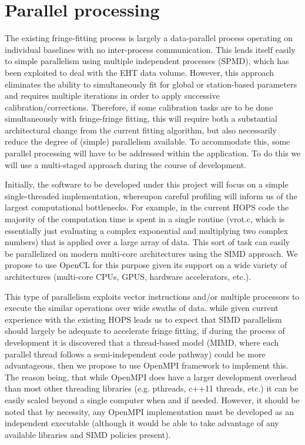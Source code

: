 \documentclass[hidelinks]{article}
\let\Oldsection\section
\renewcommand{\section}{\FloatBarrier\Oldsection}
\begin{document}


\section{Parallel processing}

The existing fringe-fitting process is largely a data-parallel process operating on individual baselines with no inter-process
communication. This lends itself easily to simple parallelism using multiple independent processes (SPMD), which has been exploited
\cite{blackburn2019eht} to deal with the EHT data volume. However, this approach eliminates the ability to simultaneously fit for global or station-based
parameters and requires multiple iterations in order to apply successive calibration/corrections. Therefore, if some calibration tasks are to be
done simultaneously with fringe-fringe fitting, this will require both a substantial architectural change from the current fitting algorithm, but
also necessarily reduce the degree of (simple) parallelism available. To accommodate this, some parallel processing will have to be addressed
within the application. To do this we will use a multi-staged approach during the course of development.

Initially, the software to be developed under this project will focus on a simple single-threaded implementation, whereupon careful
profiling will inform us of the largest computational bottlenecks. For example, in the current HOPS code the majority of
the computation time is spent in a single routine (vrot.c, which is essentially just evaluating a complex exponential and multiplying two complex numbers) that is applied over
a large array of data. This sort of task can easily be parallelized on modern multi-core architectures using the SIMD approach. We propose to use OpenCL
for this purpose given its support on a wide variety of architectures (multi-core CPUs, GPUS, hardware accelerators, etc.).

This type of parallelism exploits vector instructions and/or multiple processors to execute the similar operations over wide swaths of data. while given current experience with the existing HOPS leads us to expect that SIMD parallelism should largely be adequate to accelerate fringe fitting, if during the process of development it is discovered that a thread-based model (MIMD, where each parallel thread follows a semi-independent code pathway) could be more advantageous, then we propose to use OpenMPI framework to implement this. The reason being, that while OpenMPI does have a larger development overhead than most other threading libraries (e.g. pthreads, c++11 threads, etc.) it can be easily scaled beyond a single computer when and if needed. However, it should be noted that by necessity, any OpenMPI implementation must be developed as an independent executable (although it would be able to take advantage of any available libraries and SIMD policies present). 
\end{document}
